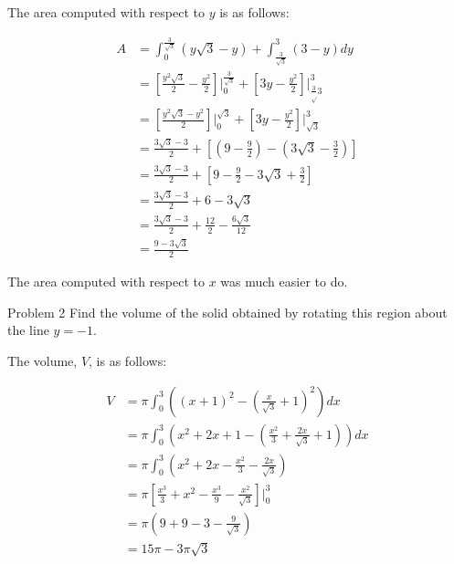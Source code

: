 \documentclass{article}
\begin{document}
    The area computed with respect to $y$ is as follows:

    \begin{align*}
        A   &= \int_0^{\frac{3}{\sqrt{3}}} \left(y\sqrt{3}-y\right) + \int^3_{\frac{3}{\sqrt{3}}} (3-y)dy \\
            &= \left[\frac{y^2\sqrt{3}}{2}-\frac{y^2}{2}\right]\Big|_0^{\frac{3}{\sqrt{3}}} + \left[3y-\frac{y^2}{2}\right]\Big|^3_{\frac{3}\sqrt{3}} \\
            &= \left[\frac{y^2\sqrt{3}-y^2}{2}\right]\Bigg|_0^{\sqrt{3}} + \left[3y-\frac{y^2}{2}\right]\Bigg|^3_{\sqrt{3}} \\
            &= \frac{3\sqrt{3}-3}{2} + \left[\left(9-\frac{9}{2}\right)-\left(3\sqrt{3}-\frac{3}{2}\right)\right] \\
            &= \frac{3\sqrt{3}-3}{2} + \left[9-\frac{9}{2}-3\sqrt{3}+\frac{3}{2}\right] \\
            &= \frac{3\sqrt{3}-3}{2} + 6 - 3\sqrt{3} \\
            &= \frac{3\sqrt{3}-3}{2} + \frac{12}{2} - \frac{6\sqrt{3}}{12} \\
            &= \frac{9-3\sqrt{3}}{2}
    \end{align*}

    The area computed with respect to $x$ was much easier to do.

    \pagebreak

    \begin{tbhtheorem}{Problem 2}
        Find the volume of the solid obtained by rotating this region about the line $y=-1$.
    \end{tbhtheorem}

    The volume, $V$, is as follows:

    \begin{align*}
        V   &= \pi\int^3_0 \left((x+1)^2-\left(\frac{x}{\sqrt{3}}+1\right)^2\right)dx \\
            &= \pi\int^3_0 \left(x^2+2x+1-\left(\frac{x^2}{3}+\frac{2x}{\sqrt{3}}+1\right)\right)dx \\
            &= \pi\int^3_0 \left(x^2+2x-\frac{x^2}{3}-\frac{2x}{\sqrt{3}}\right) \\
            &= \pi\left[\frac{x^3}{3}+x^2-\frac{x^3}{9}-\frac{x^2}{\sqrt{3}}\right]\Bigg|^3_0 \\
            &= \pi\left(9 + 9 - 3 - \frac{9}{\sqrt{3}}\right) \\
            &= 15\pi - 3\pi\sqrt{3}
    \end{align*}
\end{document}
